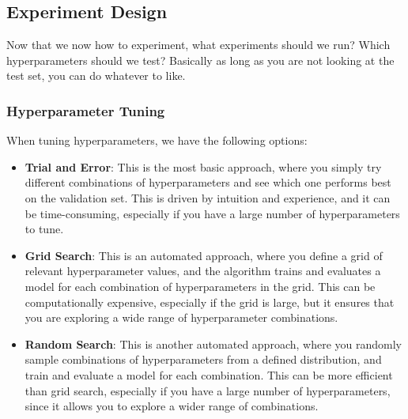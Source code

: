 \subsection{Experiment Design}
Now that we now how to experiment, what experiments should we run? Which hyperparameters should we test? 
Basically as long as you are not looking at the test set, you can do whatever to like.

\subsubsection{Hyperparameter Tuning}
When tuning hyperparameters, we have the following options:
\begin{itemize}
    \item \textbf{Trial and Error}: This is the most basic approach, where you simply try different combinations of hyperparameters and see which one performs best on the validation set.
    This is driven by intuition and experience, and it can be time-consuming, especially if you have a large number of hyperparameters to tune.
    \item \textbf{Grid Search}: This is an automated approach, where you define a grid of relevant hyperparameter values, and the algorithm trains and evaluates a model for each combination of hyperparameters in the grid.
    This can be computationally expensive, especially if the grid is large, but it ensures that you are exploring a wide range of hyperparameter combinations.
    \item \textbf{Random Search}: This is another automated approach, where you randomly sample combinations of hyperparameters from a defined distribution, and train and evaluate a model for each combination.
    This can be more efficient than grid search, especially if you have a large number of hyperparameters, since it allows you to explore a wider range of combinations.
\end{itemize}